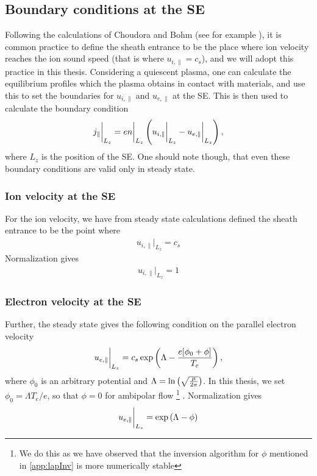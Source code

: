 \subsection{Boundary conditions at the SE}
Following the calculations of Choudora and Bohm (see for example \cite{Stangeby2000book}), it is common practice to define the sheath entrance to be the place where ion velocity reaches the ion sound speed (that is where $u_{i,\|}=c_s$), and we will adopt this practice in this thesis.
Considering a quiescent plasma, one can calculate the equilibrium profiles which the plasma obtains in contact with materials, and use this to set the boundaries for $u_{i, \|}$ and $u_{e, \|}$ at the SE.
This is then used to calculate the boundary condition
%
\begin{align*}
    j_\|\bigg|_{L_z}=en\bigg|_{L_z}\left(u_{i, \|}\bigg|_{L_z}-u_{e, \|}\bigg|_{L_z}\right),
\end{align*}
%
where $L_z$ is the position of the SE.
One should note though, that even these boundary conditions are valid only in steady state.

\subsubsection{Ion velocity at the SE}
For the ion velocity, we have from steady state calculations defined the sheath entrance to be the point where
%
\begin{align*}
    u_{i,\|} \bigg|_{L_z} = c_s
\end{align*}
%
Normalization gives
%
\begin{align*}
    u_{i,\|} \bigg|_{L_z} = 1
\end{align*}
%

\subsubsection{Electron velocity at the SE}
%
Further, the steady state gives the following condition on the parallel electron velocity
%
\begin{align*}
    u_{e,\|} \bigg|_{L_z} = c_s \exp\left(\Lambda - \frac{e[\phi_0 + \phi]}{T_e}\right),
\end{align*}
%
where $\phi_0$ is an arbitrary potential and $\Lambda=\ln\left(\sqrt{\frac{\mu}{2\pi}}\right)$.
In this thesis, we set $\phi_0=\Lambda T_e/e$, so that $\phi=0$ for ambipolar flow%
%
\footnote{We do this as we have observed that the inversion algorithm for $\phi$ mentioned in \cref{app:lapInv} is more numerically stable}%
%
.
Normalization gives
%
\begin{align*}
    u_{e,\|} \bigg|_{L_z} = \exp\left(\Lambda - \phi\right)
\end{align*}
%


